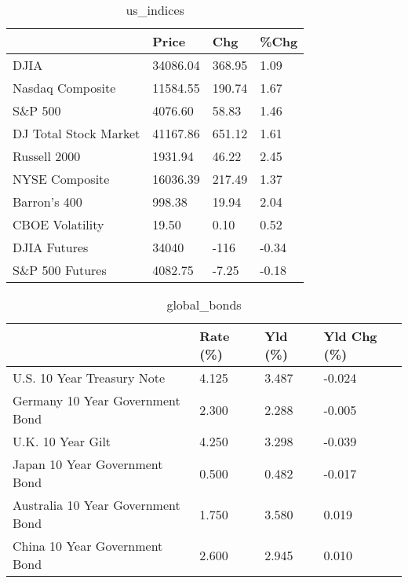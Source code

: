 \documentclass{article}%
\begin{document}
%


\begin{table}[htbp]%
\caption{us\_indices}%
\centering%
\begin{adjustbox}{width=1\textwidth}%
\begin{tabular}{llll}
\toprule
                      &    Price &    Chg &  \%Chg \\
\midrule
                 DJIA & 34086.04 & 368.95 &  1.09 \\
     Nasdaq Composite & 11584.55 & 190.74 &  1.67 \\
              S\&P 500 &  4076.60 &  58.83 &  1.46 \\
DJ Total Stock Market & 41167.86 & 651.12 &  1.61 \\
         Russell 2000 &  1931.94 &  46.22 &  2.45 \\
       NYSE Composite & 16036.39 & 217.49 &  1.37 \\
         Barron's 400 &   998.38 &  19.94 &  2.04 \\
      CBOE Volatility &    19.50 &   0.10 &  0.52 \\
         DJIA Futures &    34040 &   -116 & -0.34 \\
      S\&P 500 Futures &  4082.75 &  -7.25 & -0.18 \\
\bottomrule
\end{tabular}
%
\end{adjustbox}%
\end{table}

%


\begin{table}[htbp]%
\caption{global\_bonds}%
\centering%
\begin{adjustbox}{width=1\textwidth}%
\begin{tabular}{llll}
\toprule
                                  & Rate (\%) & Yld (\%) & Yld Chg (\%) \\
\midrule
       U.S. 10 Year Treasury Note &    4.125 &   3.487 &      -0.024 \\
  Germany 10 Year Government Bond &    2.300 &   2.288 &      -0.005 \\
                U.K. 10 Year Gilt &    4.250 &   3.298 &      -0.039 \\
    Japan 10 Year Government Bond &    0.500 &   0.482 &      -0.017 \\
Australia 10 Year Government Bond &    1.750 &   3.580 &       0.019 \\
    China 10 Year Government Bond &    2.600 &   2.945 &       0.010 \\
\bottomrule
\end{tabular}
%
\end{adjustbox}%
\end{table}
\end{document}
